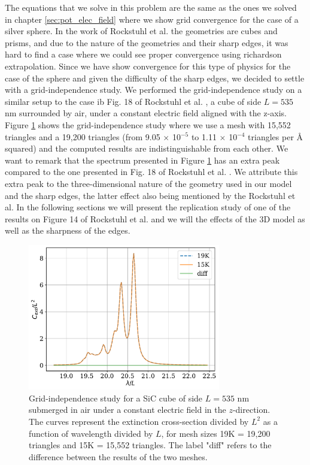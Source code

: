 The equations that we solve in this problem are the same as the ones we solved in chapter \ref{sec:pot_elec_field} where we show grid convergence for the case of 
a silver sphere. In the work of Rockstuhl et al. \cite{rockstuhl2005} the geometries are cubes and prisms, and due to the nature of the geometries 
and their sharp edges, it was hard to find a case where we could see proper convergence using richardson extrapolation. Since we have show convergence for this type of physics
for the case of the sphere and given the difficulty of the sharp edges, we decided to settle with a grid-independence study. We performed the grid-independence study
on a similar setup to the case ib Fig. 18 of Rockstuhl et al. \cite{rockstuhl2005}, a cube of side $L=535$ nm surrounded by air, under a constant electric field aligned with the 
z-axis. Figure \ref{fig:cube535} shows the grid-independence study where we use a mesh with 15,552 triangles and a 19,200 triangles 
(from 9.05 $\times$ 10$^{-5}$ to 1.11 $\times$ 10$^{-4}$ triangles per $\text{\AA}$ squared) and the computed results are indistinguishable from each other.
We want to remark that the spectrum presented in Figure \ref{fig:cube535} has an extra peak compared to the one presented in Fig. 18 of Rockstuhl et al. \cite{rockstuhl2005}. We attribute
this extra peak to the three-dimensional nature of the geometry used in our model and the sharp edges, the latter effect also being mentioned by the Rockstuhl et al.
In the following sections we will present the replication study of one of the results on Figure 14 of Rockstuhl et al. and we will the effects of the 3D model as well as the sharpness of the edges. 

\begin{figure}
    \centering
    \includegraphics[width=0.75\textwidth]{cubeL535nm_15Kvs19K.pdf} 
    \caption{Grid-independence study for a SiC cube of side $L=535$ nm submerged in air under a constant 
    electric field in the $z$-direction. The curves represent the extinction cross-section divided by $L^2$ 
    as a function of wavelength divided by $L$, for mesh sizes 19K = 19,200 triangles and 15K = 15,552 triangles. 
    The label "diff" refers to the difference between the results of the two meshes.}
    \label{fig:cube535}
 \end{figure}

